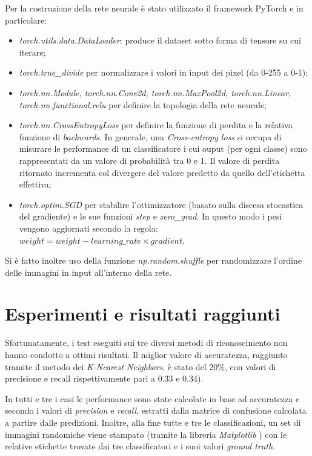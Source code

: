 \documentclass[11pt, a4paper, titlepage]{article}
\begin{document}
\medskip 
Per la costruzione della rete neurale è stato utilizzato il framework PyTorch \cite{pytorch} e in particolare:
\begin{itemize}
    \item \emph{torch.utils.data.DataLoader}: produce il dataset sotto forma di tensore su cui iterare;
    \item \emph{torch.true\_divide} per normalizzare i valori in input dei pixel (da 0-255 a 0-1);
    \item \emph{torch.nn.Module, torch.nn.Conv2d, torch.nn.MaxPool2d, torch.nn.Linear, torch.nn.functional.relu} per definire la topologia della rete neurale;
    \item \emph{torch.nn.CrossEntropyLoss} per definire la funzione di perdita e la relativa funzione di \emph{backwards}. In generale, una \emph{Cross-entropy loss} si occupa di misurare le performance di un classificatore i cui ouput (per ogni classe) sono rappresentati da un valore di probabilità tra 0 e 1. Il valore di perdita ritornato incrementa col divergere del valore predetto da quello dell'etichetta effettiva;
    \item \emph{torch.optim.SGD} per stabilire l'ottimizzatore (basato sulla discesa stocastica del gradiente) e le sue funzioni \emph{step} e \emph{zero\_grad}. In questo modo i pesi vengono aggiornati secondo la regola: $weight = weight - learning\_rate \times gradient$.
\end{itemize}

Si è fatto inoltre uso della funzione \emph{np.random.shuffle} \cite{numpy1}\cite{numpy2} per randomizzare l'ordine delle immagini in input all'interno della rete. 

\newpage
\section{Esperimenti e risultati raggiunti}
Sfortunatamente, i test eseguiti sui tre diversi metodi di riconoscimento non hanno condotto a ottimi risultati. Il miglior valore di accuratezza, raggiunto tramite il metodo dei \emph{K-Nearest Neighbors}, è stato del 20\%, con valori di precisione e recall rispettivamente pari a 0.33 e 0.34).

In tutti e tre i casi le performance sono state calcolate in base ad accuratezza e secondo i valori di \emph{precision} e \emph{recall}, estratti dalla matrice di confusione calcolata a partire dalle predizioni. Inoltre, alla fine tutte e tre le classificazioni, un set di immagini randomiche viene stampato (tramite la libreria \emph{Matplotlib} \cite{matplotlib}) con le relative etichette trovate dai tre classificatori e i suoi valori \emph{ground truth}.
\end{document}
